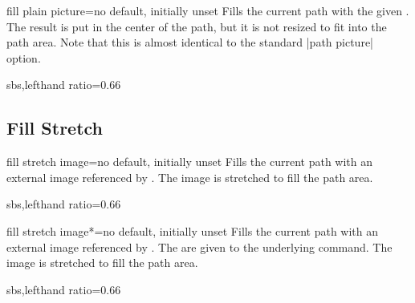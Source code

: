 \begin{docTikzKey}{fill plain picture}{=}{no default, initially unset}
  Fills the current path with the given .
  The result is put in the center of the path, but it is not resized to fit into
  the path area. Note that this is almost identical to the standard |path picture| option.
\begin{dispExample*}{sbs,lefthand ratio=0.66}
\end{dispExample*}
\end{docTikzKey}


\clearpage
\subsection{Fill Stretch}
\begin{docTikzKey}{fill stretch image}{=}{no default, initially unset}
  Fills the current path with an external image referenced by .
  The image is stretched to fill the path area.
\begin{dispExample*}{sbs,lefthand ratio=0.66}
\end{dispExample*}
\end{docTikzKey}


\begin{docTikzKey}{fill stretch image*}{=}{no default, initially unset}
  Fills the current path with an external image referenced by .
  The  are given to the underlying  command.
  The image is stretched to fill the path area.
\begin{dispExample*}{sbs,lefthand ratio=0.66}
\end{dispExample*}
\end{docTikzKey}


